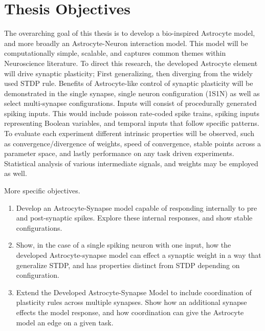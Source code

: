 \section{Thesis Objectives}

The overarching goal of this thesis is to develop a bio-inspired Astrocyte
model, and more broadly an Astrocyte-Neuron interaction model. This model will
be computationally simple, scalable, and captures common themes within
Neuroscience literature. To direct this research, the developed Astrocyte
element will drive synaptic plasticity; First generalizing, then diverging from
the widely used STDP rule. Benefits of Astrocyte-like control of synaptic
plasticity will be demonstrated in the single synapse, single neuron
configuration (1S1N) as well as select multi-synapse configurations. Inputs will
consist of procedurally generated spiking inputs. This would include poisson
rate-coded spike trains, spiking inputs representing Boolean variables, and
temporal inputs that follow specific patterns. To evaluate each experiment
different intrinsic properties will be observed, such as convergence/divergence
of weights, speed of convergence, stable points across a parameter space, and
lastly performance on any task driven experiments. Statistical analysis of
various intermediate signals, and weights may be employed as well.

More specific objectives.
\begin{enumerate}
  \item Develop an Astrocyte-Synapse model capable of responding internally to pre and
    post-synaptic spikes. Explore these internal responses, and show stable configurations.

  \item Show, in the case of a single spiking neuron with one input, how
    the developed Astrocyte-synapse model can effect a synaptic weight in a way
    that generalize STDP, and has properties distinct from STDP depending on
    configuration.

  \item Extend the Developed Astrocyte-Synapse Model to include coordination of
    plasticity rules across multiple synapses. Show how an additional synapse
    effects the model response, and how coordination can give the Astrocyte
    model an edge on a given task.

\end{enumerate}
